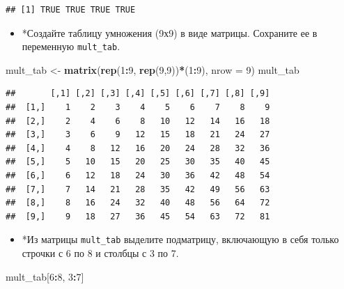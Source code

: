 \documentclass[]{book}
\newenvironment{Shaded}{\begin{snugshade}}{\end{snugshade}}
\newcommand{\KeywordTok}[1]{\textcolor[rgb]{0.13,0.29,0.53}{\textbf{#1}}}
\newcommand{\DataTypeTok}[1]{\textcolor[rgb]{0.13,0.29,0.53}{#1}}
\newcommand{\DecValTok}[1]{\textcolor[rgb]{0.00,0.00,0.81}{#1}}
\newcommand{\StringTok}[1]{\textcolor[rgb]{0.31,0.60,0.02}{#1}}
\newcommand{\CommentTok}[1]{\textcolor[rgb]{0.56,0.35,0.01}{\textit{#1}}}
\newcommand{\OperatorTok}[1]{\textcolor[rgb]{0.81,0.36,0.00}{\textbf{#1}}}
\newcommand{\NormalTok}[1]{#1}
\providecommand{\tightlist}{%
  \setlength{\itemsep}{0pt}\setlength{\parskip}{0pt}}
\begin{document}
\begin{verbatim}
## [1] TRUE TRUE TRUE TRUE
\end{verbatim}

\begin{itemize}
\tightlist
\item
  *Создайте таблицу умножения (9х9) в виде матрицы. Сохраните ее в
  переменную \texttt{mult\_tab}.
\end{itemize}

\begin{Shaded}
\begin{Highlighting}[]
\NormalTok{mult_tab <-}\StringTok{ }\KeywordTok{matrix}\NormalTok{(}\KeywordTok{rep}\NormalTok{(}\DecValTok{1}\OperatorTok{:}\DecValTok{9}\NormalTok{, }\KeywordTok{rep}\NormalTok{(}\DecValTok{9}\NormalTok{,}\DecValTok{9}\NormalTok{))}\OperatorTok{*}\NormalTok{(}\DecValTok{1}\OperatorTok{:}\DecValTok{9}\NormalTok{), }\DataTypeTok{nrow =} \DecValTok{9}\NormalTok{)}
\NormalTok{mult_tab}
\end{Highlighting}
\end{Shaded}

\begin{verbatim}
##       [,1] [,2] [,3] [,4] [,5] [,6] [,7] [,8] [,9]
##  [1,]    1    2    3    4    5    6    7    8    9
##  [2,]    2    4    6    8   10   12   14   16   18
##  [3,]    3    6    9   12   15   18   21   24   27
##  [4,]    4    8   12   16   20   24   28   32   36
##  [5,]    5   10   15   20   25   30   35   40   45
##  [6,]    6   12   18   24   30   36   42   48   54
##  [7,]    7   14   21   28   35   42   49   56   63
##  [8,]    8   16   24   32   40   48   56   64   72
##  [9,]    9   18   27   36   45   54   63   72   81
\end{verbatim}

\begin{Shaded}
\end{Shaded}

\begin{itemize}
\tightlist
\item
  *Из матрицы \texttt{mult\_tab} выделите подматрицу, включающую в себя
  только строчки с 6 по 8 и столбцы с 3 по 7.
\end{itemize}

\begin{Shaded}
\begin{Highlighting}[]
\NormalTok{mult_tab[}\DecValTok{6}\OperatorTok{:}\DecValTok{8}\NormalTok{, }\DecValTok{3}\OperatorTok{:}\DecValTok{7}\NormalTok{]}
\end{Highlighting}
\end{Shaded}
\end{document}
